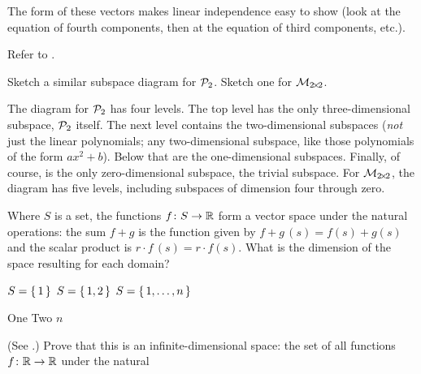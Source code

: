 \begin{exercises}
\begin{answer}
       The form of these vectors makes linear independence easy to show
       (look at the equation of fourth components, then at the equation of 
       third components, etc.).  
    \end{answer}
  \item 
     Refer to .
     \begin{exparts}
       \partsitem Sketch a similar subspace diagram for $\mathcal{P}_2$.
       \partsitem Sketch one for $\mathcal{M}_{2 \! \times \! 2}$.
     \end{exparts}
     \begin{answer}
      \begin{exparts}
       \partsitem The diagram for $\mathcal{P}_2$ has four levels.
          The top level has the only three-dimensional subspace, 
          $\mathcal{P}_2$ itself.
          The next level contains the two-dimensional subspaces
          (\emph{not} just the linear polynomials; any two-dimensional
          subspace, like those polynomials of the form $ax^2+b$).
          Below that are the one-dimensional subspaces.
          Finally, of course, is the only zero-dimensional subspace,
          the trivial subspace.
        \partsitem For $\mathcal{M}_{2 \! \times \! 2}$, the diagram has five levels,
          including subspaces of dimension four through zero.
     \end{exparts}
    \end{answer}
  \recommended \item \label{exer:DimDomToR}
    Where \( S \) is a set, the functions
    \( \mbox{$f\colon S\to \mathbb{R}$} \) form a vector space under the natural operations:
    the sum $f+g$ is the function given by 
    \( f+g\,(s)=f(s)+g(s) \) and the scalar product is
    \( r\cdot f \, (s)=r\cdot f(s) \).
    What is the dimension of the space resulting for each domain?
    \begin{exparts*}
      \partsitem \( S=\mbox{$\{\,1\,\}$} \)
      \partsitem \( S=\mbox{$\{\,1,2\,\}$} \)
      \partsitem \( S=\mbox{$\{\,1,\ldots,n\,\}$} \)
    \end{exparts*}
    \begin{answer}
      \begin{exparts*}
        \partsitem One
        \partsitem Two
        \partsitem \( n \)
      \end{exparts*}  
    \end{answer}
  \item  
    (See .)
    Prove that this is an infinite-dimensional space:
    the set of all functions \( \mbox{$f\colon \mathbb{R}\to \mathbb{R}$} \) under the natural

\end{exercises}
